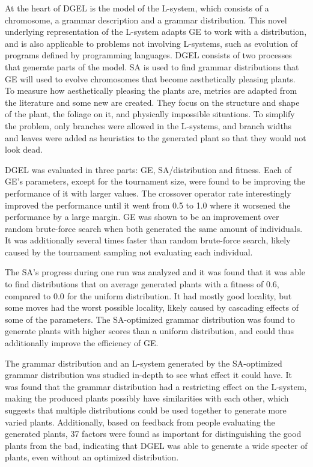 At the heart of \gls{DGEL} is the model of the \gls{L-system}, which consists of a chromosome, a grammar description and a grammar distribution.
This novel underlying representation of the \gls{L-system} adapts \gls{GE} to work with a distribution, and is also applicable to problems not involving \glspl{L-system}, such as evolution of programs defined by programming languages.
\gls{DGEL} consists of two processes that generate parts of the model.
\gls{SA} is used to find grammar distributions that \gls{GE} will used to evolve chromosomes that become aesthetically pleasing plants.
To measure how aesthetically pleasing the plants are, metrics are adapted from the literature and some new are created.
They focus on the structure and shape of the plant, the foliage on it, and physically impossible situations.
To simplify the problem, only branches were allowed in the \glspl{L-system}, and branch widths and leaves were added as heuristics to the generated plant so that they would not look dead.

\gls{DGEL} was evaluated in three parts: \gls{GE}, \gls{SA}/distribution and fitness.
Each of \gls{GE}'s parameters, except for the tournament size, were found to be improving the performance of it with larger values.
The crossover operator rate interestingly improved the performance until it went from 0.5 to 1.0 where it worsened the performance by a large margin.
\gls{GE} was shown to be an improvement over random brute-force search when both generated the same amount of individuals.
It was additionally several times faster than random brute-force search, likely caused by the tournament sampling not evaluating each individual.

The \gls{SA}'s progress during one run was analyzed and it was found that it was able to find distributions that on average generated plants with a fitness of 0.6, compared to 0.0 for the uniform distribution.
It had mostly good locality, but some moves had the worst possible locality, likely caused by cascading effects of some of the parameters.
The \gls{SA}-optimized grammar distribution was found to generate plants with higher scores than a uniform distribution, and could thus additionally improve the efficiency of \gls{GE}.

The grammar distribution and an \gls{L-system} generated by the \gls{SA}-optimized grammar distribution was studied in-depth to see what effect it could have.
It was found that the grammar distribution had a restricting effect on the \gls{L-system}, making the produced plants possibly have similarities with each other, which suggests that multiple distributions could be used together to generate more varied plants.
Additionally, based on feedback from people evaluating the generated plants, 37 factors were found as important for distinguishing the good plants from the bad, indicating that \gls{DGEL} was able to generate a wide specter of plants, even without an optimized distribution.

